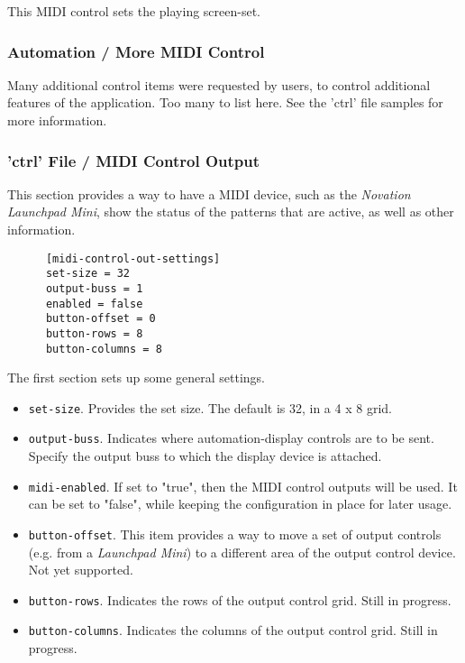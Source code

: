 This MIDI control sets the playing screen-set.

\subsubsection{Automation / More MIDI Control}
\label{subsubsec:configuration_midi_ctrl_automationex}

   Many additional control items were requested by users, to control
   additional features of the application.  Too many to list here.
   See the 'ctrl' file samples for more information.

\subsubsection{'ctrl' File / MIDI Control Output}
\label{subsubsec:configuration_ctrl_midi_control_out}

   This section provides a way to have a MIDI device, such as the
   \textsl{Novation Launchpad Mini}, show the status
   of the patterns that are active, as well as other information.

   \begin{verbatim}
      [midi-control-out-settings]
      set-size = 32
      output-buss = 1
      enabled = false
      button-offset = 0
      button-rows = 8
      button-columns = 8
   \end{verbatim}

   The first section sets up some general settings.

   \begin{itemize}
      \item \texttt{set-size}.
         Provides the set size.  The default is 32, in a 4 x 8 grid.
      \item \texttt{output-buss}.
         Indicates where automation-display controls are to be sent.
         Specify the output buss to which the display device is attached.
      \item \texttt{midi-enabled}.
         If set to "true", then the MIDI control outputs will be used.
         It can be set to "false", while keeping the configuration in place
         for later usage.
      \item \texttt{button-offset}.
         This item provides a way to move a set of output controls (e.g. from a
         \textsl{Launchpad Mini}) to a different area of the output control
         device.  Not yet supported.
      \item \texttt{button-rows}.
         Indicates the rows of the output control grid.
         Still in progress.
      \item \texttt{button-columns}.
         Indicates the columns of the output control grid.
         Still in progress.
   \end{itemize}

